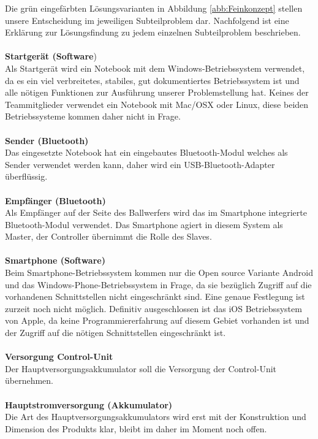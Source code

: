 	Die grün eingefärbten Lösungsvarianten in Abbildung \ref{abb:Feinkonzept} stellen unsere Entscheidung im jeweiligen Subteilproblem dar. Nachfolgend ist eine Erklärung zur Lösungsfindung zu jedem einzelnen Subteilproblem beschrieben.\\
	\\	
	\textbf{Startgerät (Software})\\
	Als Startgerät wird ein Notebook mit dem Windows-Betriebssystem verwendet, da es ein viel verbreitetes, stabiles, gut dokumentiertes Betriebssystem ist und alle nötigen Funktionen zur Ausführung unserer Problemstellung hat. Keines der Teammitglieder verwendet ein Notebook mit Mac/OSX oder Linux, diese beiden Betriebssysteme kommen daher nicht in Frage.\\
	\\
	\textbf{Sender (Bluetooth)}\\
	Das eingesetzte Notebook hat ein eingebautes Bluetooth-Modul welches als Sender verwendet werden kann, daher wird ein USB-Bluetooth-Adapter überflüssig.\\
	\\
	\textbf{Empfänger (Bluetooth)}\\
	Als Empfänger auf der Seite des Ballwerfers wird das im Smartphone integrierte Bluetooth-Modul verwendet. Das Smartphone agiert in diesem System als Master, der Controller übernimmt die Rolle des Slaves.\\
	\\
	\textbf{Smartphone (Software)}\\
	Beim Smartphone-Betriebssystem kommen nur die Open source Variante Android und das Windows-Phone-Betriebssystem in Frage, da sie bezüglich Zugriff auf die vorhandenen Schnittstellen nicht eingeschränkt sind. Eine genaue Festlegung ist zurzeit noch nicht möglich. Definitiv ausgeschlossen ist das iOS Betriebssystem von Apple, da keine Programmiererfahrung auf diesem Gebiet vorhanden ist und der Zugriff auf die nötigen Schnittstellen eingeschränkt ist.\\
	\\
	\textbf{Versorgung Control-Unit}\\
	Der Hauptversorgungsakkumulator soll die Versorgung der Control-Unit übernehmen.\\
	\\
	\textbf{Hauptstromversorgung (Akkumulator)}\\
	Die Art des Hauptversorgungsakkumulators wird erst mit der Konstruktion und Dimension des Produkts klar, bleibt im daher im Moment noch offen.\\
